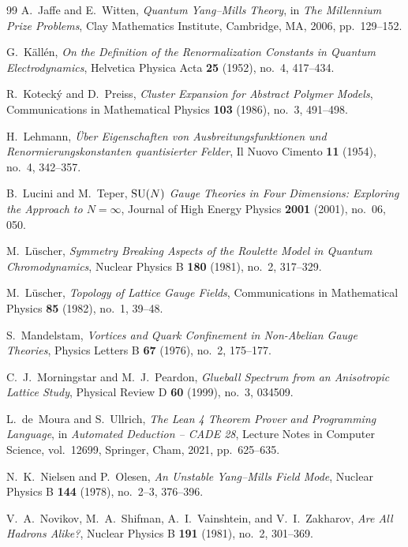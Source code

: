 \begin{thebibliography}{99}
A.~Jaffe and E.~Witten,
\textit{Quantum Yang--Mills Theory},
in \textit{The Millennium Prize Problems}, Clay Mathematics Institute, Cambridge, MA, 2006, pp.~129--152.

G.~K{\"a}ll{\'e}n,
\textit{On the Definition of the Renormalization Constants in Quantum Electrodynamics},
Helvetica Physica Acta \textbf{25} (1952), no.~4, 417--434.

R.~Koteck{\'y} and D.~Preiss,
\textit{Cluster Expansion for Abstract Polymer Models},
Communications in Mathematical Physics \textbf{103} (1986), no.~3, 491--498.

H.~Lehmann,
\textit{{\"U}ber Eigenschaften von Ausbreitungsfunktionen und Renormierungskonstanten quantisierter Felder},
Il Nuovo Cimento \textbf{11} (1954), no.~4, 342--357.

B.~Lucini and M.~Teper,
\textit{$\mathrm{SU}(N)$ Gauge Theories in Four Dimensions: Exploring the Approach to $N = \infty$},
Journal of High Energy Physics \textbf{2001} (2001), no.~06, 050.

M.~L{\"u}scher,
\textit{Symmetry Breaking Aspects of the Roulette Model in Quantum Chromodynamics},
Nuclear Physics B \textbf{180} (1981), no.~2, 317--329.

M.~L{\"u}scher,
\textit{Topology of Lattice Gauge Fields},
Communications in Mathematical Physics \textbf{85} (1982), no.~1, 39--48.

S.~Mandelstam,
\textit{Vortices and Quark Confinement in Non-Abelian Gauge Theories},
Physics Letters B \textbf{67} (1976), no.~2, 175--177.

C.~J.~Morningstar and M.~J.~Peardon,
\textit{Glueball Spectrum from an Anisotropic Lattice Study},
Physical Review D \textbf{60} (1999), no.~3, 034509.

L.~de~Moura and S.~Ullrich,
\textit{The Lean 4 Theorem Prover and Programming Language},
in \textit{Automated Deduction -- CADE 28}, Lecture Notes in Computer Science, vol.~12699, Springer, Cham, 2021, pp.~625--635.

N.~K.~Nielsen and P.~Olesen,
\textit{An Unstable Yang--Mills Field Mode},
Nuclear Physics B \textbf{144} (1978), no.~2--3, 376--396.

V.~A.~Novikov, M.~A.~Shifman, A.~I.~Vainshtein, and V.~I.~Zakharov,
\textit{Are All Hadrons Alike?},
Nuclear Physics B \textbf{191} (1981), no.~2, 301--369.


\end{thebibliography}
